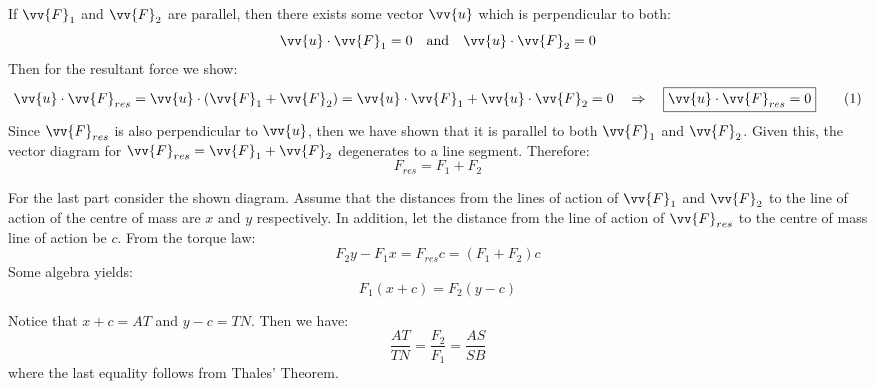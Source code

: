 \newpage
{}
If $\vv{F}_1$ and $\vv{F}_2$ are parallel, then there exists some vector $\vv{u}$ which is perpendicular to both:
\begin{equation*}
	\vv{u} \cdot \vv{F}_1 = 0
	\quad\text{and}\quad
	\vv{u} \cdot \vv{F}_2 = 0
\end{equation*}
Then for the resultant force we show:
\begin{equation*}
	\vv{u} \cdot \vv{F}_{res}
	=
	\vv{u} \cdot 
	\left(
	\vv{F}_1 + \vv{F}_2
	\right)
	=
	\vv{u} \cdot \vv{F}_1
	+
	\vv{u} \cdot \vv{F}_2
	=
	0
	\quad\Rightarrow\quad
	\boxed{\vv{u} \cdot \vv{F}_{res} = 0}
	\tag{$1$}
	\label{eq:j17_p4_1}
\end{equation*}
Since $\vv{F}_{res}$ is also perpendicular to $\vv{u}$, then we have shown that it is parallel to both $\vv{F}_1$ and $\vv{F}_2$. Given this, the vector diagram for $\vv{F}_{res} = \vv{F}_1 + \vv{F}_2$ degenerates to a line segment. Therefore:
\begin{equation*}
	\boxed{F_{res} = F_1 + F_2
	}
	\tag{$2$}
	\label{eq:j17_p4_2}
\end{equation*}
\begin{minipage}[t][145pt]{\textwidth}
	\vspace{0pt}
	
	\begin{minipage}[t][143pt]{0.49\textwidth}
		\vspace{2pt}
		For the last part consider the shown diagram. Assume that the distances from the lines of action of $\vv{F}_1$ and $\vv{F}_2$ to the line of action of the centre of mass are $x$ and $y$ respectively. In addition, let the distance from the line of action of $\vv{F}_{res}$ to the centre of mass line of action be $c$. From the torque law:
		\begin{equation*}
			F_2 y - F_1 x = F_{res} c = (F_1 + F_2) c
		\end{equation*}
		Some algebra yields:
		\begin{equation*}
			F_1 (x + c) = F_2 (y - c)
		\end{equation*}
	\end{minipage}
\end{minipage}
Notice that $x + c = AT$ and $y - c = TN$. Then we have:
\begin{equation*}
	\boxed{\frac{AT}{TN} = \frac{F_2}{F_1} = \frac{AS}{SB}}
	\tag{$3$}
	\label{eq:j17_p4_3}
\end{equation*}
where the last equality follows from Thales' Theorem.